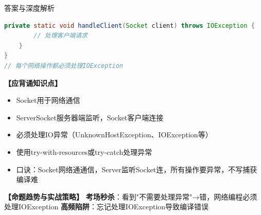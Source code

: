 \documentclass[12pt, a4paper]{ctexart}
\begin{document}
\begin{enumerate}[label=\textbf{\arabic*.}]
\begin{bluebox}{答案与深度解析}
\begin{itemize}[leftmargin=*, nosep, label={}]
\begin{itemize}[label={}, leftmargin=*, nosep]
\begin{lstlisting}[language=Java]
    private static void handleClient(Socket client) throws IOException {
        // 处理客户端请求
    }
}
// 每个网络操作都必须处理IOException
					      \end{lstlisting}
			            \end{itemize}
		      \end{itemize}

		      \textbf{【应背诵知识点】}
		      \begin{itemize}[label={}, nosep]
			      \item Socket用于网络通信
			      \item ServerSocket服务器端监听，Socket客户端连接
			      \item 必须处理IO异常（UnknownHostException、IOException等）
			      \item 使用try-with-resources或try-catch处理异常
			      \item 口诀：Socket网络通通信，Server监听Socket连，所有操作要异常，不写捕获编译难
		      \end{itemize}

		      \textbf{【命题趋势与实战策略】}
		      \textbf{考场秒杀}：看到"不需要处理异常"→错，网络编程必须处理IOException
		      \textbf{高频陷阱}：忘记处理IOException导致编译错误
	      \end{bluebox}

\end{enumerate}
\end{document}
